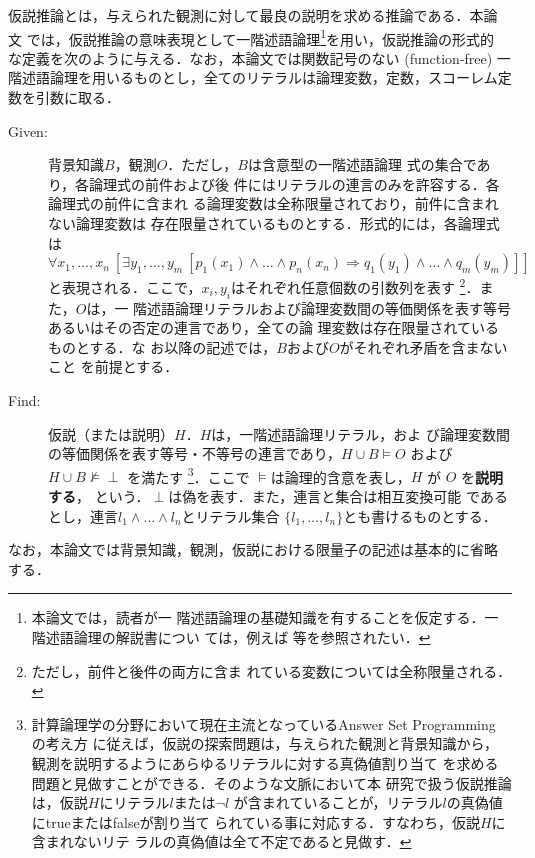 \documentclass[japanese]{jnlp_1.4}
\begin{document}
仮説推論とは，与えられた観測に対して最良の説明を求める推論である．本論
文
では，仮説推論の意味表現として一階述語論理\footnote{本論文では，読者が一
階述語論理の基礎知識を有することを仮定する．一階述語論理の解説書につい
ては，例えば \cite{Nienhuys97} 等を参照されたい．}を用い，仮説推論の形式的
な定義を次のように与える．なお，本論文では関数記号のない (function-free)
一階述語論理を用いるものとし，全てのリテラルは論理変数，定数，スコーレム定
数を引数に取る．
\begin{description}
\item[Given:] 背景知識$B$，観測$O$．ただし，$B$は含意型の一階述語論理
	      式の集合であり，各論理式の前件および後
	      件にはリテラルの連言のみを許容する．各論理式の前件に含まれ
	      る論理変数は全称限量されており，前件に含まれない論理変数は
	      存在限量されているものとする．形式的には，各論理式は
	      $\forall x_1, \ldots,
	      x_n\ [\exists y_1, \ldots, y_m\
	      [p_1(x_1) \land \ldots \land p_n(x_n)
	      \Rightarrow q_1(y_1) \land \ldots \land
	      q_m(y_m)]]$ と表現される．ここで，$x_i,
	      y_i$はそれぞれ任意個数の引数列を表す
	      \footnote{ただし，前件と後件の両方に含ま
	      れている変数については全称限量される．}．また，$O$は，一
	      階述語論理リテラルおよび論理変数間の等価関係を表す等号
	      あるいはその否定の連言であり，全ての論
	      理変数は存在限量されているものとする．な
	      お以降の記述では，$B$および$O$がそれぞれ矛盾を含まないこと
	      を前提とする．
\item[Find:] 仮説（または説明）$H$．$H$は，一階述語論理リテラル，およ
	      び論理変数間の等価関係を表す等号・不等号の連言であり，$H
	      \cup B \models O$ および $H \cup B \nvDash \perp$ を満たす
	      \footnote{計算論理学の分野において現在主流となっているAnswer
	      Set Programming~\cite{Reiter87,Moore83,Gelfond88} の考え方
	      に従えば，仮説の探索問題は，与えられた観測と背景知識から，
	      観測を説明するようにあらゆるリテラルに対する真偽値割り当て
	      を求める問題と見做すことができる．そのような文脈において本
	      研究で扱う仮説推論は，仮説$H$にリテラル$l$または$\lnot l$
	      が含まれていることが，リテラル$l$の真偽値にtrueまたはfalseが割り当て
	      られている事に対応する．すなわち，仮説$H$に含まれないリテ
	      ラルの真偽値は全て不定であると見做す．}．ここで
	      $\models$は論理的含意を表し，$H$ が $O$ を\textbf{説明する}，
	      という．$\perp$は偽を表す．また，連言と集合は相互変換可能
	      であるとし，連言$l_1 \land \ldots \land l_n$とリテラル集合
	      $\{l_1, \ldots ,l_n\}$とも書けるものとする．
\end{description}
なお，本論文では背景知識，観測，仮説における限量子の記述は基本的に省略
する．
\end{document}
